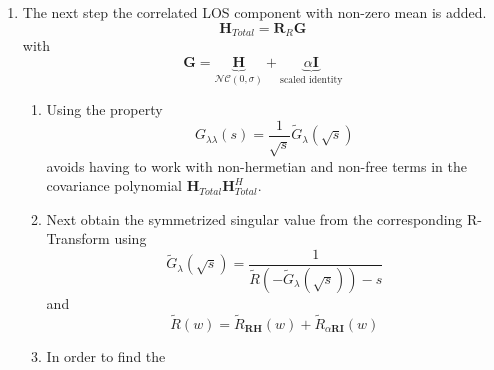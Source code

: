 \documentclass[12pt,a4paper]{report}
\begin{document}
\begin{enumerate}
\item
The next step the correlated LOS component with non-zero mean is added. 
	\begin{equation}
	\mathbf{H}_{Total} = \mathbf{R}_{R}\mathbf{G}
	\end{equation}
	with 
	\begin{equation}
	\mathbf{G} = \underbrace{\mathbf{H}}_{\mathcal{NC}(0,\sigma)} + \underbrace{\alpha\mathbf{I}}_{\text{scaled identity}}
	\end{equation}
	\begin{enumerate}
	\item
	Using the property 
		\begin{equation}\label{svd_aed_property}
		G_{\lambda\lambda}(s) = \frac{1}{\sqrt{s}}\tilde{G}_{\lambda}(\sqrt{s})
		\end{equation}
	avoids having to work with non-hermetian and non-free terms in the covariance polynomial $\mathbf{H}_{Total}\mathbf{H}_{Total}^H$. 
	\item 
		Next obtain the symmetrized singular value from the corresponding R-Transform using
		\begin{equation}
		\tilde{G}_{\lambda}(\sqrt{s}) = \frac{1}{\tilde{R}(-\tilde{G}_{\lambda}(\sqrt{s})) - s}
		\end{equation}
		and 
			\begin{equation}
			\tilde{R}(w) = \tilde{R}_{\mathbf{R}\mathbf{H}}(w) + \tilde{R}_{\alpha\mathbf{R}\mathbf{I}}(w)
			\end{equation}
	\item 
		In order to find the 
	\end{enumerate}	
\end{enumerate}
\end{document}
